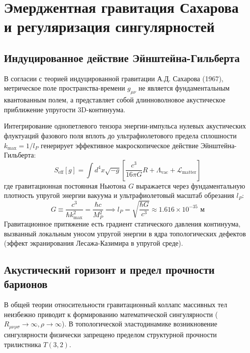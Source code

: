 \documentclass[12pt,a4paper]{article}
\begin{document}
\section{Эмерджентная гравитация Сахарова и регуляризация сингулярностей}

\subsection{Индуцированное действие Эйнштейна-Гильберта}
В согласии с теорией индуцированной гравитации А.Д. Сахарова (1967), метрическое поле пространства-времени $g_{\mu\nu}$ не является фундаментальным квантованным полем, а представляет собой длинноволновое акустическое приближение упругости 3D-континуума.

Интегрирование однопетлевого тензора энергии-импульса нулевых акустических флуктуаций фазового поля вплоть до ультрафиолетового предела сплошности $k_{\text{max}} = 1/l_P$ генерирует эффективное макроскопическое действие Эйнштейна-Гильберта:
\begin{equation}
	S_{\text{eff}}[g] = \int d^4x \sqrt{-g} \left[ \frac{c^3}{16\pi G} R + \Lambda_{\text{vac}} + \mathcal{L}_{\text{matter}} \right]
\end{equation}
где гравитационная постоянная Ньютона $G$ выражается через фундаментальную плотность упругой энергии вакуума и ультрафиолетовый масштаб обрезания $l_P$:
\begin{equation}
	G \equiv \frac{c^3}{\hbar k_{\text{max}}^2} = \frac{\hbar c}{M_P^2} \implies l_P = \sqrt{\frac{\hbar G}{c^3}} \approx 1.616 \times 10^{-35} \text{ м}
\end{equation}
Гравитационное притяжение есть градиент статического давления континуума, вызванный локальным уносом упругой энергии в ядра топологических дефектов (эффект экранирования Лесажа-Казимира в упругой среде).

\subsection{Акустический горизонт и предел прочности барионов}
В общей теории относительности гравитационный коллапс массивных тел неизбежно приводит к формированию математической сингулярности ($R_{\mu\nu\rho\sigma} \to \infty, \rho \to \infty$). В топологической эластодинамике возникновение сингулярности физически запрещено пределом структурной прочности трилистника $T(3,2)$.
\end{document}
